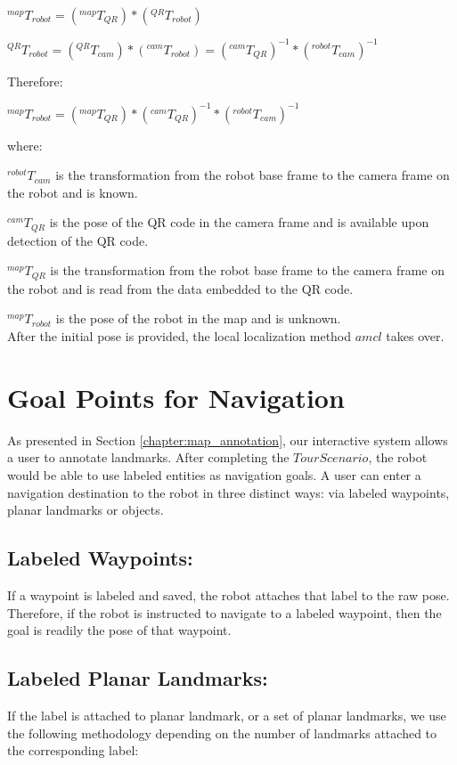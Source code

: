 $^{map}T_{robot}=(^{map}T_{QR})*(^{QR}T_{robot})$

$^{QR}T_{robot}=(^{QR}T_{cam})*(^{cam}T_{robot})=(^{cam}T_{QR})^{-1} * (^{robot}T_{cam})^{-1}$

Therefore:

$^{map}T_{robot}=(^{map}T_{QR})*(^{cam}T_{QR})^{-1} * (^{robot}T_{cam})^{-1}$

where:

$^{robot}T_{cam}$ is the transformation from the robot base frame to the camera frame on the robot and is known.

$^{cam}T_{QR}$ is the pose of the QR code in the camera frame and is available upon detection of the QR code.

$^{map}T_{QR}$ is the transformation from the robot base frame to the camera frame on the robot and is read from the data embedded to the QR code.

$^{map}T_{robot}$ is the pose of the robot in the map and is unknown.\\

After the initial pose is provided, the local localization method $amcl$ takes over.

\section{Goal Points for Navigation}
\label{sec:navigation_finding_goal_points_for_navigation}

As presented in Section \ref{chapter:map_annotation}, our interactive system allows a user to annotate landmarks. After completing the $Tour Scenario$, the robot would be able to use labeled entities as navigation goals. A user can enter a navigation destination to the robot in three distinct ways: via labeled waypoints, planar landmarks or objects.

\subsection{Labeled Waypoints:} If a waypoint is labeled and saved, the robot attaches that label to the raw pose. Therefore, if the robot is instructed to navigate to a labeled waypoint, then the goal is readily the pose of that waypoint.
\subsection{Labeled Planar Landmarks:} If the label is attached to planar landmark, or a set of planar landmarks, we use the following methodology depending on the number of landmarks attached to the corresponding label:

